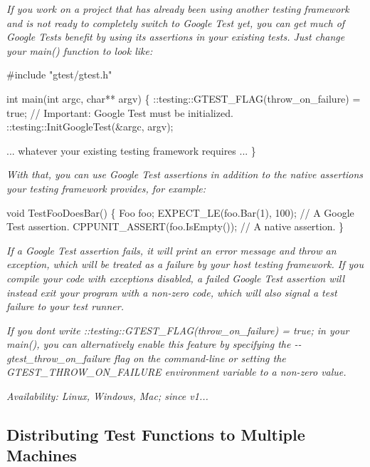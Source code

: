 {\itshape }

{\itshape If you work on a project that has already been using another testing framework and is not ready to completely switch to Google Test yet, you can get much of Google Test\textquotesingle{}s benefit by using its assertions in your existing tests. Just change your {\ttfamily main()} function to look like\+:}

{\itshape 
\begin{DoxyCode}
#include "gtest/gtest.h"

int main(int argc, char** argv) \{
  ::testing::GTEST\_FLAG(throw\_on\_failure) = true;
  // Important: Google Test must be initialized.
  ::testing::InitGoogleTest(&argc, argv);

  ... whatever your existing testing framework requires ...
\}
\end{DoxyCode}
}

{\itshape With that, you can use Google Test assertions in addition to the native assertions your testing framework provides, for example\+:}

{\itshape 
\begin{DoxyCode}
void TestFooDoesBar() \{
  Foo foo;
  EXPECT\_LE(foo.Bar(1), 100);     // A Google Test assertion.
  CPPUNIT\_ASSERT(foo.IsEmpty());  // A native assertion.
\}
\end{DoxyCode}
}

{\itshape If a Google Test assertion fails, it will print an error message and throw an exception, which will be treated as a failure by your host testing framework. If you compile your code with exceptions disabled, a failed Google Test assertion will instead exit your program with a non-\/zero code, which will also signal a test failure to your test runner.}

{\itshape If you don\textquotesingle{}t write {\ttfamily \+::testing\+::\+G\+T\+E\+S\+T\+\_\+\+F\+L\+A\+G(throw\+\_\+on\+\_\+failure) = true;} in your {\ttfamily main()}, you can alternatively enable this feature by specifying the {\ttfamily -\/-\/gtest\+\_\+throw\+\_\+on\+\_\+failure} flag on the command-\/line or setting the {\ttfamily G\+T\+E\+S\+T\+\_\+\+T\+H\+R\+O\+W\+\_\+\+O\+N\+\_\+\+F\+A\+I\+L\+U\+RE} environment variable to a non-\/zero value.}

{\itshape {\itshape Availability\+:} Linux, Windows, Mac; since v1...}

{\itshape \subsection*{Distributing Test Functions to Multiple Machines}}

